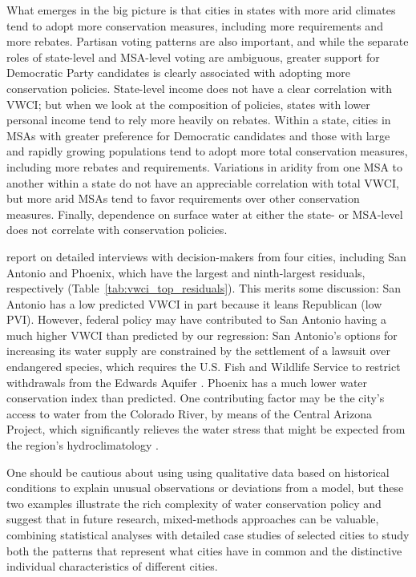 \documentclass[draft,linenumbers]{agujournal}\usepackage{knitr}
\begin{document}
What emerges in the big picture is that cities in states with
more arid climates tend to adopt more
conservation measures, including more requirements and more rebates.
Partisan voting patterns are also important, and while the separate roles
of state-level and MSA-level voting are ambiguous, greater support for
Democratic Party candidates is clearly associated with adopting more conservation policies.
State-level income does not have a clear correlation with VWCI;
but when we look at the composition of policies, states with lower personal
income tend to rely more heavily on rebates.
Within a state, cities in MSAs with greater
preference for Democratic candidates
and those
with large and rapidly growing populations tend to adopt more total conservation
measures, including more rebates and requirements.
Variations in aridity from one MSA to another within a state do not have an appreciable
correlation with total VWCI, but more arid MSAs tend to favor requirements over other
conservation measures.
Finally, dependence on surface water at either the state- or MSA-level
does not correlate with conservation policies.

\citet{brown:politics:2016} report on detailed interviews with decision-makers
from four cities, including San Antonio and Phoenix, which have the largest
and ninth-largest residuals, respectively
(Table~\ref{tab:vwci_top_residuals}).
This merits some discussion:
San Antonio has a low predicted VWCI in part because
it leans Republican (low PVI).
However, federal policy may have
contributed to San Antonio having a much higher VWCI than predicted by our
regression: San Antonio's options for increasing its water supply are
constrained by the settlement of a lawsuit over endangered species, which
requires the U.S. Fish and Wildlife Service to restrict withdrawals from the
Edwards Aquifer \citep{brown:politics:2016}.
Phoenix has a much lower water conservation index than predicted.
One contributing factor may be the city's access to water from the Colorado River,
by means of the Central Arizona Project, which significantly relieves the
water stress that might be expected from the region's hydroclimatology
\citep{brown:politics:2016}.

One should be cautious about using using qualitative data based on historical
conditions to explain unusual observations or deviations from a model,
but these two examples illustrate the rich complexity of water conservation
policy and suggest that in future research, mixed-methods approaches
can be valuable, combining statistical analyses with detailed case studies
of selected cities to study both the patterns that represent what cities
have in common and the distinctive individual characteristics of different cities.
\end{document}
